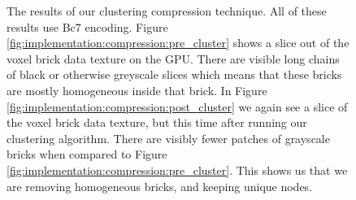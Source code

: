 \begin{figure}[H]
    \centering
    \hfill
    \caption{The results of our clustering compression technique. All of these results use Bc7 encoding. Figure \ref{fig:implementation:compression:pre_cluster} shows a slice out of the voxel brick data texture on the GPU. There are visible long chains of black or otherwise greyscale slices which means that these bricks are mostly homogeneous inside that brick. In Figure \ref{fig:implementation:compression:post_cluster} we again see a slice of the voxel brick data texture, but this time after running our clustering algorithm. There are visibly fewer patches of grayscale bricks when compared to Figure \ref{fig:implementation:compression:pre_cluster}. This shows us that we are removing homogeneous bricks, and keeping unique nodes.} \label{fig:implementation:compression:cluster}
\end{figure}



